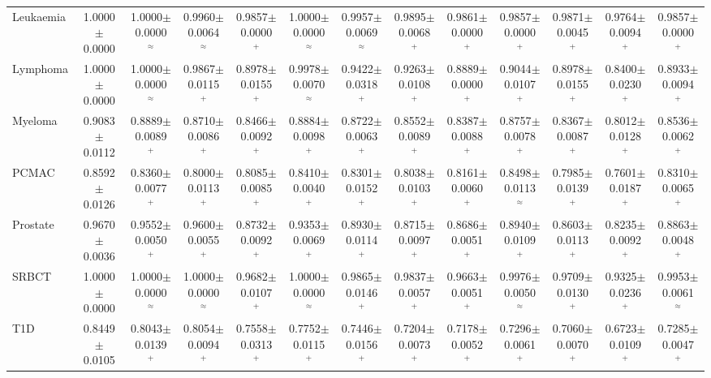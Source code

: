 \begin{table}
{\begin{tabular}{l *{12}{c}}
Leukaemia & 1.0000$\pm$0.0000 & 1.0000$\pm$0.0000 $^{\approx}$ & 0.9960$\pm$0.0064 $^{\approx}$ & 0.9857$\pm$0.0000 $^{+}$ & 1.0000$\pm$0.0000 $^{\approx}$ & 0.9957$\pm$0.0069 $^{\approx}$ & 0.9895$\pm$0.0068 $^{+}$ & 0.9861$\pm$0.0000 $^{+}$ & 0.9857$\pm$0.0000 $^{+}$ & 0.9871$\pm$0.0045 $^{+}$ & 0.9764$\pm$0.0094 $^{+}$ & 0.9857$\pm$0.0000 $^{+}$ \\
Lymphoma & 1.0000$\pm$0.0000 & 1.0000$\pm$0.0000 $^{\approx}$ & 0.9867$\pm$0.0115 $^{+}$ & 0.8978$\pm$0.0155 $^{+}$ & 0.9978$\pm$0.0070 $^{\approx}$ & 0.9422$\pm$0.0318 $^{+}$ & 0.9263$\pm$0.0108 $^{+}$ & 0.8889$\pm$0.0000 $^{+}$ & 0.9044$\pm$0.0107 $^{+}$ & 0.8978$\pm$0.0155 $^{+}$ & 0.8400$\pm$0.0230 $^{+}$ & 0.8933$\pm$0.0094 $^{+}$ \\
Myeloma & 0.9083$\pm$0.0112 & 0.8889$\pm$0.0089 $^{+}$ & 0.8710$\pm$0.0086 $^{+}$ & 0.8466$\pm$0.0092 $^{+}$ & 0.8884$\pm$0.0098 $^{+}$ & 0.8722$\pm$0.0063 $^{+}$ & 0.8552$\pm$0.0089 $^{+}$ & 0.8387$\pm$0.0088 $^{+}$ & 0.8757$\pm$0.0078 $^{+}$ & 0.8367$\pm$0.0087 $^{+}$ & 0.8012$\pm$0.0128 $^{+}$ & 0.8536$\pm$0.0062 $^{+}$ \\
PCMAC & 0.8592$\pm$0.0126 & 0.8360$\pm$0.0077 $^{+}$ & 0.8000$\pm$0.0113 $^{+}$ & 0.8085$\pm$0.0085 $^{+}$ & 0.8410$\pm$0.0040 $^{+}$ & 0.8301$\pm$0.0152 $^{+}$ & 0.8038$\pm$0.0103 $^{+}$ & 0.8161$\pm$0.0060 $^{+}$ & 0.8498$\pm$0.0113 $^{\approx}$ & 0.7985$\pm$0.0139 $^{+}$ & 0.7601$\pm$0.0187 $^{+}$ & 0.8310$\pm$0.0065 $^{+}$ \\
Prostate & 0.9670$\pm$0.0036 & 0.9552$\pm$0.0050 $^{+}$ & 0.9600$\pm$0.0055 $^{+}$ & 0.8732$\pm$0.0092 $^{+}$ & 0.9353$\pm$0.0069 $^{+}$ & 0.8930$\pm$0.0114 $^{+}$ & 0.8715$\pm$0.0097 $^{+}$ & 0.8686$\pm$0.0051 $^{+}$ & 0.8940$\pm$0.0109 $^{+}$ & 0.8603$\pm$0.0113 $^{+}$ & 0.8235$\pm$0.0092 $^{+}$ & 0.8863$\pm$0.0048 $^{+}$ \\
SRBCT & 1.0000$\pm$0.0000 & 1.0000$\pm$0.0000 $^{\approx}$ & 1.0000$\pm$0.0000 $^{\approx}$ & 0.9682$\pm$0.0107 $^{+}$ & 1.0000$\pm$0.0000 $^{\approx}$ & 0.9865$\pm$0.0146 $^{+}$ & 0.9837$\pm$0.0057 $^{+}$ & 0.9663$\pm$0.0051 $^{+}$ & 0.9976$\pm$0.0050 $^{\approx}$ & 0.9709$\pm$0.0130 $^{+}$ & 0.9325$\pm$0.0236 $^{+}$ & 0.9953$\pm$0.0061 $^{\approx}$ \\
T1D & 0.8449$\pm$0.0105 & 0.8043$\pm$0.0139 $^{+}$ & 0.8054$\pm$0.0094 $^{+}$ & 0.7558$\pm$0.0313 $^{+}$ & 0.7752$\pm$0.0115 $^{+}$ & 0.7446$\pm$0.0156 $^{+}$ & 0.7204$\pm$0.0073 $^{+}$ & 0.7178$\pm$0.0052 $^{+}$ & 0.7296$\pm$0.0061 $^{+}$ & 0.7060$\pm$0.0070 $^{+}$ & 0.6723$\pm$0.0109 $^{+}$ & 0.7285$\pm$0.0047 $^{+}$ \\

\end{tabular}}
\end{table}
